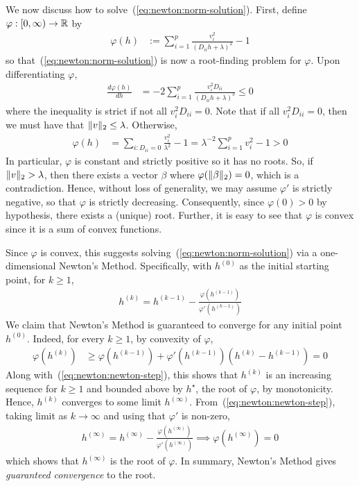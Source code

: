 We now discuss how to solve~(\ref{eq:newton:norm-solution}).
First, define $\varphi : [0, \infty) \to \mathbb{R}$ by
\begin{align*}
    \varphi(h)
    &:=
    \sum\limits_{i=1}^p
    \frac{v_i^2}{(D_{ii} h + \lambda)^2}
    - 1
\end{align*}
so that~(\ref{eq:newton:norm-solution}) is now a root-finding problem for $\varphi$.
Upon differentiating $\varphi$,
\begin{align*}
    \frac{d\varphi(h)}{dh}
    &=
    -2 \sum\limits_{i=1}^p
    \frac{v_i^2 D_{ii}}{(D_{ii} h + \lambda)^3}
    \leq
    0
\end{align*}
where the inequality is strict if not all $v_i^2 D_{ii} = 0$.
Note that if all $v_i^2 D_{ii} = 0$, then we must have that $\|v\|_2 \leq \lambda$.
Otherwise,
\begin{align*}
    \varphi(h)
    &=
    \sum\limits_{i : D_{ii} = 0}
    \frac{v_i^2}{\lambda^2}
    - 1
    =
    \lambda^{-2} \sum\limits_{i=1}^p v_i^2 - 1
    > 0
\end{align*}
In particular, $\varphi$ is constant and strictly positive so it has no roots.
So, if $\|v\|_2 > \lambda$, then there exists a vector $\beta$
where $\varphi(\|\beta\|_2) = 0$, which is a contradiction.
Hence, without loss of generality, we may assume $\varphi'$ is strictly negative,
so that $\varphi$ is strictly decreasing.
Consequently, since $\varphi(0) > 0$ by hypothesis, there exists a (unique) root.
Further, it is easy to see that $\varphi$ is convex since it is a 
sum of convex functions.

Since $\varphi$ is convex, this suggests solving~(\ref{eq:newton:norm-solution})
via a one-dimensional Newton's Method.
Specifically, with $h^{(0)}$ as the initial starting point, for $k\geq 1$,
\begin{align}
    h^{(k)} = h^{(k-1)} - \frac{\varphi(h^{(k-1)})}{\varphi'(h^{(k-1)})}
    \label{eq:newton:newton-step}
\end{align}
We claim that Newton's Method is guaranteed to converge for any initial point $h^{(0)}$.
Indeed, for every $k\geq 1$, by convexity of $\varphi$,
\begin{align*}
    \varphi(h^{(k)})
    &\geq
    \varphi(h^{(k-1)})
    + \varphi'(h^{(k-1)}) (h^{(k)} - h^{(k-1)})
    =
    0
\end{align*}
Along with~(\ref{eq:newton:newton-step}),
this shows that $h^{(k)}$ is an increasing sequence for $k\geq 1$ 
and bounded above by $h^\star$, the root of $\varphi$, by monotonicity.
Hence, $h^{(k)}$ converges to some limit $h^{(\infty)}$. 
From~(\ref{eq:newton:newton-step}), taking limit as $k\to \infty$ and using that $\varphi'$ is non-zero,
\begin{align*}
    h^{(\infty)} = h^{(\infty)} - \frac{\varphi(h^{(\infty)})}{\varphi'(h^{(\infty)})}
    \implies
    \varphi(h^{(\infty)}) = 0
\end{align*}
which shows that $h^{(\infty)}$ is the root of $\varphi$.
In summary, Newton's Method gives \emph{guaranteed convergence} to the root.

